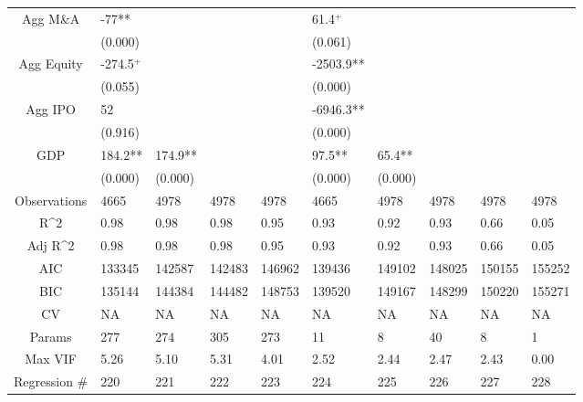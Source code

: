 \documentclass{article}
\begin{document}
\begin{table}[H]
\begin{tabular}{|clllllllll|}
  Agg M\&A & -77** &  &  &  & 61.4$^{+}$ &  &  &  &  \\ 
   & (0.000) &  &  &  & (0.061) &  &  &  &  \\ 
  Agg Equity & -274.5$^{+}$ &  &  &  & -2503.9** &  &  &  &  \\ 
   & (0.055) &  &  &  & (0.000) &  &  &  &  \\ 
  Agg IPO & 52 &  &  &  & -6946.3** &  &  &  &  \\ 
   & (0.916) &  &  &  & (0.000) &  &  &  &  \\ 
  GDP & 184.2** & 174.9** &  &  & 97.5** & 65.4** &  &  &  \\ 
   & (0.000) & (0.000) &  &  & (0.000) & (0.000) &  &  &  \\ 
  \hline 
 Observations & 4665 & 4978 & 4978 & 4978 & 4665 & 4978 & 4978 & 4978 & 4978 \\ 
  R^2 & 0.98 & 0.98 & 0.98 & 0.95 & 0.93 & 0.92 & 0.93 & 0.66 & 0.05 \\ 
  Adj R^2 & 0.98 & 0.98 & 0.98 & 0.95 & 0.93 & 0.92 & 0.93 & 0.66 & 0.05 \\ 
  AIC & 133345 & 142587 & 142483 & 146962 & 139436 & 149102 & 148025 & 150155 & 155252 \\ 
  BIC & 135144 & 144384 & 144482 & 148753 & 139520 & 149167 & 148299 & 150220 & 155271 \\ 
  CV & NA & NA & NA & NA & NA & NA & NA & NA & NA \\ 
  Params & 277 & 274 & 305 & 273 & 11 & 8 & 40 & 8 & 1 \\ 
  Max VIF & 5.26 & 5.10 & 5.31 & 4.01 & 2.52 & 2.44 & 2.47 & 2.43 & 0.00 \\ 
  Regression \# & 220 & 221 & 222 & 223 & 224 & 225 & 226 & 227 & 228 \\ 
   \hline
\end{tabular}
 
\end{table}
\end{document}
